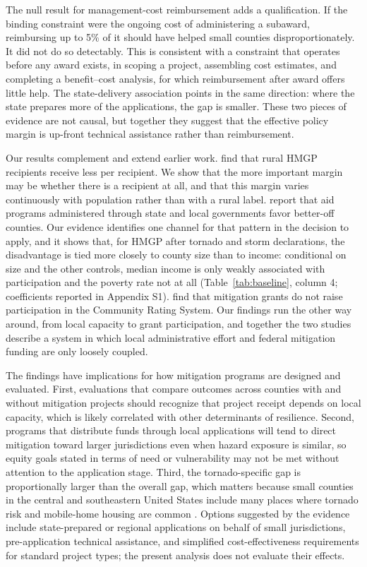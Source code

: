 \documentclass[12pt]{article}
\begin{document}
The null result for management-cost reimbursement adds a qualification. If the binding constraint were the ongoing cost of administering a subaward, reimbursing up to 5\% of it should have helped small counties disproportionately. It did not do so detectably. This is consistent with a constraint that operates before any award exists, in scoping a project, assembling cost estimates, and completing a benefit--cost analysis, for which reimbursement after award offers little help. The state-delivery association points in the same direction: where the state prepares more of the applications, the gap is smaller. These two pieces of evidence are not causal, but together they suggest that the effective policy margin is up-front technical assistance rather than reimbursement.

Our results complement and extend earlier work. \textcite{seong2022naturally} find that rural HMGP recipients receive less per recipient. We show that the more important margin may be whether there is a recipient at all, and that this margin varies continuously with population rather than with a rural label. \textcite{miao2025equity} report that aid programs administered through state and local governments favor better-off counties. Our evidence identifies one channel for that pattern in the decision to apply, and it shows that, for HMGP after tornado and storm declarations, the disadvantage is tied more closely to county size than to income: conditional on size and the other controls, median income is only weakly associated with participation and the poverty rate not at all (Table~\ref{tab:baseline}, column 4; coefficients reported in Appendix S1). \textcite{frimpong2023federal} find that mitigation grants do not raise participation in the Community Rating System. Our findings run the other way around, from local capacity to grant participation, and together the two studies describe a system in which local administrative effort and federal mitigation funding are only loosely coupled.

The findings have implications for how mitigation programs are designed and evaluated. First, evaluations that compare outcomes across counties with and without mitigation projects should recognize that project receipt depends on local capacity, which is likely correlated with other determinants of resilience. Second, programs that distribute funds through local applications will tend to direct mitigation toward larger jurisdictions even when hazard exposure is similar, so equity goals stated in terms of need or vulnerability may not be met without attention to the application stage. Third, the tornado-specific gap is proportionally larger than the overall gap, which matters because small counties in the central and southeastern United States include many places where tornado risk and mobile-home housing are common \parencite{ashley2007fatalities,sutter2010mobile}. Options suggested by the evidence include state-prepared or regional applications on behalf of small jurisdictions, pre-application technical assistance, and simplified cost-effectiveness requirements for standard project types; the present analysis does not evaluate their effects.
\end{document}
